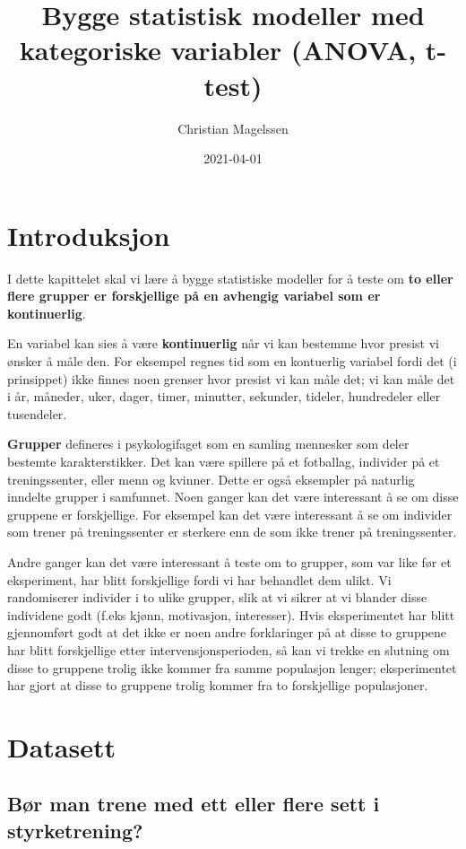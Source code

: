 \documentclass[
]{book}
\title{Bygge statistisk modeller med kategoriske variabler (ANOVA, t-test)}
\author{Christian Magelssen}
\date{2021-04-01}
\begin{document}
\maketitle

{
\setcounter{tocdepth}{1}
\tableofcontents
}
\hypertarget{intro}{%
\chapter{Introduksjon}\label{intro}}

I dette kapittelet skal vi lære å bygge statistiske modeller for å teste om \textbf{to eller flere grupper er forskjellige på en avhengig variabel som er kontinuerlig}.

En variabel kan sies å være \textbf{kontinuerlig} når vi kan bestemme hvor presist vi ønsker å måle den. For eksempel regnes tid som en kontuerlig variabel fordi det (i prinsippet) ikke finnes noen grenser hvor presist vi kan måle det; vi kan måle det i år, måneder, uker, dager, timer, minutter, sekunder, tideler, hundredeler eller tusendeler.

\textbf{Grupper} defineres i psykologifaget som en samling mennesker som deler bestemte karakterstikker. Det kan være spillere på et fotballag, individer på et treningssenter, eller menn og kvinner. Dette er også eksempler på naturlig inndelte grupper i samfunnet. Noen ganger kan det være interessant å se om disse gruppene er forskjellige. For eksempel kan det være interessant å se om individer som trener på treningssenter er sterkere enn de som ikke trener på treningssenter.

Andre ganger kan det være interessant å teste om to grupper, som var like før et eksperiment, har blitt forskjellige fordi vi har behandlet dem ulikt. Vi randomiserer individer i to ulike grupper, slik at vi sikrer at vi blander disse individene godt (f.eks kjønn, motivasjon, interesser). Hvis eksperimentet har blitt gjennomført godt at det ikke er noen andre forklaringer på at disse to gruppene har blitt forskjellige etter intervensjonsperioden, så kan vi trekke en slutning om disse to gruppene trolig ikke kommer fra samme populasjon lenger; eksperimentet har gjort at disse to gruppene trolig kommer fra to forskjellige populasjoner.

\hypertarget{datasett}{%
\chapter{Datasett}\label{datasett}}

\hypertarget{buxf8r-man-trene-med-ett-eller-flere-sett-i-styrketrening}{%
\section{Bør man trene med ett eller flere sett i styrketrening?}\label{buxf8r-man-trene-med-ett-eller-flere-sett-i-styrketrening}}
\end{document}
